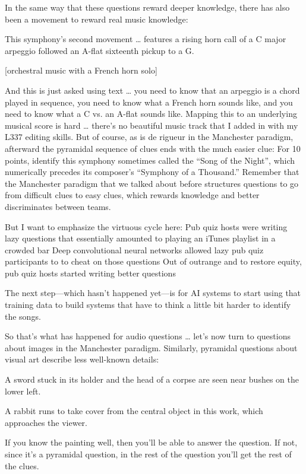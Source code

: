In the same way that these questions reward deeper knowledge, there has also been a movement to reward real music knowledge:  

This symphony’s second movement … features a rising horn call of a C major arpeggio followed an A-flat sixteenth pickup to a G. 

[orchestral music with a French horn solo]


And this is just asked using text … you need to know that an arpeggio is a chord played in sequence, you need to know what a French horn sounds like, and you need to know what a C vs. an A-flat sounds like.  Mapping this to an underlying musical score is hard … there’s no beautiful music track that I added in with my L337 editing skills.  But of course, as is de rigueur in the Manchester paradigm, afterward the pyramidal sequence of clues ends with the much easier clue:
For 10 points, identify this symphony sometimes called the “Song of the Night”, which numerically precedes its composer’s “Symphony of a Thousand.”
Remember that the Manchester paradigm that we talked about before structures questions to go from difficult clues to easy clues, which rewards knowledge and better discriminates between teams.

But I want to emphasize the virtuous cycle here:
Pub quiz hosts were writing lazy questions that essentially amounted to playing an iTunes playlist in a crowded bar
Deep convolutional neural networks allowed lazy pub quiz participants to to cheat on those questions
Out of outrange and to restore equity, pub quiz hosts started writing better questions

The next step—which hasn’t happened yet—is for AI systems to start using that training data to build systems that have to think a little bit harder to identify the songs.

So that’s what has happened for audio questions … let’s now turn to questions about images in the Manchester paradigm.  Similarly, pyramidal questions about visual art describe less well-known details:

A sword stuck in its holder and the head of a corpse are seen near bushes on the lower left.

A rabbit runs to take cover from the central object in this work, which approaches the viewer.

If you know the painting well, then you’ll be able to answer the question.  If not, since it’s a pyramidal question, in the rest of the question you’ll get the rest of the clues.    

